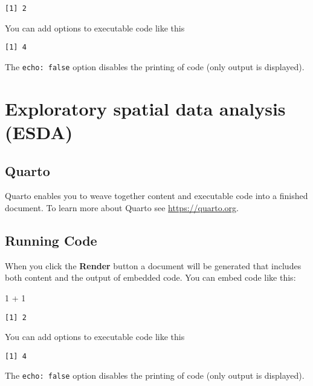\documentclass[
  letterpaper,
  DIV=11,
  numbers=noendperiod]{scrreprt}
\newenvironment{Shaded}{\begin{snugshade}}{\end{snugshade}}
\newcommand{\DecValTok}[1]{\textcolor[rgb]{0.68,0.00,0.00}{#1}}
\newcommand{\SpecialCharTok}[1]{\textcolor[rgb]{0.37,0.37,0.37}{#1}}
\begin{document}
\begin{verbatim}
[1] 2
\end{verbatim}

You can add options to executable code like this

\begin{verbatim}
[1] 4
\end{verbatim}

The \texttt{echo:\ false} option disables the printing of code (only
output is displayed).

\hypertarget{exploratory-spatial-data-analysis-esda}{%
\chapter{Exploratory spatial data analysis
(ESDA)}\label{exploratory-spatial-data-analysis-esda}}

\hypertarget{quarto-6}{%
\section{Quarto}\label{quarto-6}}

Quarto enables you to weave together content and executable code into a
finished document. To learn more about Quarto see
\url{https://quarto.org}.

\hypertarget{running-code-6}{%
\section{Running Code}\label{running-code-6}}

When you click the \textbf{Render} button a document will be generated
that includes both content and the output of embedded code. You can
embed code like this:

\begin{Shaded}
\begin{Highlighting}[]
\DecValTok{1} \SpecialCharTok{+} \DecValTok{1}
\end{Highlighting}
\end{Shaded}

\begin{verbatim}
[1] 2
\end{verbatim}

You can add options to executable code like this

\begin{verbatim}
[1] 4
\end{verbatim}

The \texttt{echo:\ false} option disables the printing of code (only
output is displayed).
\end{document}
